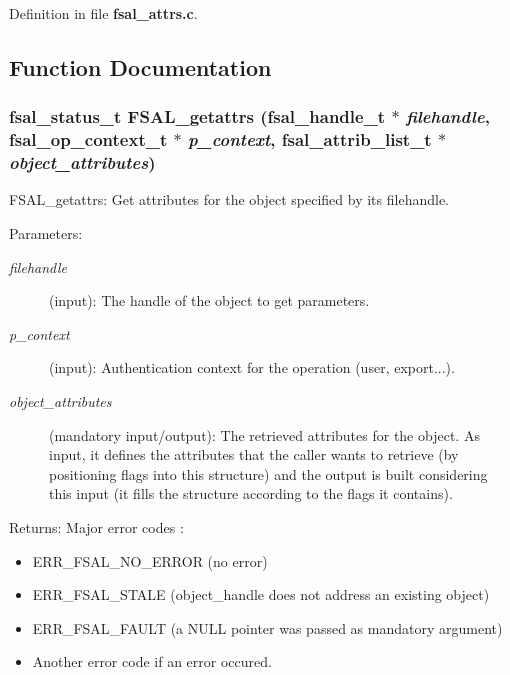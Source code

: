 Definition in file {\bf fsal\_\-attrs.c}.

\subsection{Function Documentation}
\subsubsection{\setlength{\rightskip}{0pt plus 5cm}fsal\_\-status\_\-t FSAL\_\-getattrs (fsal\_\-handle\_\-t $\ast$ {\em filehandle}, fsal\_\-op\_\-context\_\-t $\ast$ {\em p\_\-context}, fsal\_\-attrib\_\-list\_\-t $\ast$ {\em object\_\-attributes})}\label{fsal__attrs_8c_a0}


FSAL\_\-getattrs: Get attributes for the object specified by its filehandle.

\begin{Desc}
\item[Parameters:]
\begin{description}
\item[{\em filehandle}](input): The handle of the object to get parameters. \item[{\em p\_\-context}](input): Authentication context for the operation (user, export...). \item[{\em object\_\-attributes}](mandatory input/output): The retrieved attributes for the object. As input, it defines the attributes that the caller wants to retrieve (by positioning flags into this structure) and the output is built considering this input (it fills the structure according to the flags it contains).\end{description}
\end{Desc}
\begin{Desc}
\item[Returns:]Major error codes :\begin{itemize}
\item ERR\_\-FSAL\_\-NO\_\-ERROR (no error)\item ERR\_\-FSAL\_\-STALE (object\_\-handle does not address an existing object)\item ERR\_\-FSAL\_\-FAULT (a NULL pointer was passed as mandatory argument)\item Another error code if an error occured. \end{itemize}
\end{Desc}



